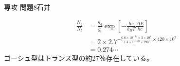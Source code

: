 \documentclass[fleqn]{jbook}
\begin{document}
\begin{answer}{専攻 問題8}{石井}
\begin{subanswers}
\begin{subsubanswers}
\SubSubAnswer
\begin{align*}
\frac{N_{g}}{N_{t}} &= \frac{g_{g}}{g_{t}} \exp \left[-\frac{hc}{k_{B}T}\frac{\Delta E}{hc}\right] \\
                  &= 2 \times 2.7 ^{-\frac{6.6 \times 10^{-34} \times 3 \times 10^{8}}{1.4 \times 10^{-23} \times 290} \times 420 \times 10^{2}}   \\
                  &= 0.274 \cdots
\end{align*}
ゴーシュ型はトランス型の約27％存在している。
\end{subsubanswers}
\end{subanswers}

\end{answer}
\end{document}

